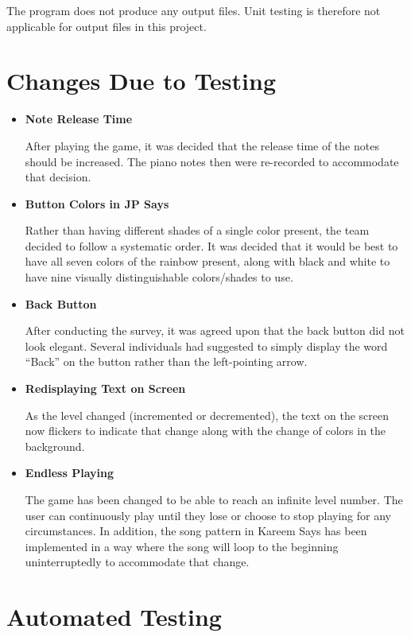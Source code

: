 \documentclass[12pt, titlepage]{article}
\begin{document}
\par The program does not produce any output files. Unit testing is therefore not applicable for output files in this project.

\section{Changes Due to Testing}
\begin{itemize}
\item \textbf {Note Release Time}
\par After playing the game, it was decided that the release time of the notes should be increased. The piano notes then were re-recorded to accommodate that decision.


\item \textbf {Button Colors in JP Says}
\par Rather than having different shades of a single color present, the team decided to follow a systematic order. It was decided that it would be best to have all seven colors of the rainbow present, along with black and white to have nine visually distinguishable colors/shades to use.

\item \textbf {Back Button}
\par After conducting the survey, it was agreed upon that the back button did not look elegant. Several individuals had suggested to simply display the word “Back” on the button rather than the left-pointing arrow.

\item \textbf {Redisplaying Text on Screen}
\par As the level changed (incremented or decremented), the text on the screen now flickers to indicate that change along with the change of colors in the background.

\item \textbf {Endless Playing}
\par The game has been changed to be able to reach an infinite level number. The user can continuously play until they lose or choose to stop playing for any circumstances. In addition, the song pattern in Kareem Says has been implemented in a way where the song will loop to the beginning uninterruptedly to accommodate that change.
\end{itemize}

\section{Automated Testing}
\end{document}
